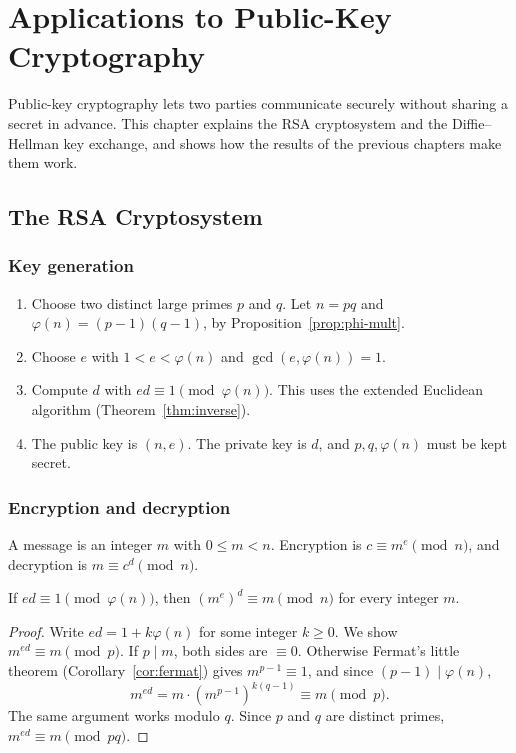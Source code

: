 \chapter{Applications to Public-Key Cryptography}\label{ch:crypto}

Public-key cryptography lets two parties communicate securely without sharing a secret in advance. This chapter explains the RSA cryptosystem and the Diffie--Hellman key exchange, and shows how the results of the previous chapters make them work.

\section{The RSA Cryptosystem}

\subsection{Key generation}

\begin{enumerate}
  \item Choose two distinct large primes $p$ and $q$. Let $n=pq$ and $\varphi(n)=(p-1)(q-1)$, by Proposition~\ref{prop:phi-mult}.
  \item Choose $e$ with $1<e<\varphi(n)$ and $\gcd(e,\varphi(n))=1$.
  \item Compute $d$ with $ed\equiv 1\pmod{\varphi(n)}$. This uses the extended Euclidean algorithm (Theorem~\ref{thm:inverse}).
  \item The public key is $(n,e)$. The private key is $d$, and $p,q,\varphi(n)$ must be kept secret.
\end{enumerate}

\subsection{Encryption and decryption}

A message is an integer $m$ with $0\le m<n$. Encryption is $c\equiv m^e\pmod n$, and decryption is $m\equiv c^d\pmod n$.

\begin{theorem}\label{thm:rsa}
If $ed\equiv 1\pmod{\varphi(n)}$, then $(m^e)^d\equiv m\pmod n$ for every integer $m$.
\end{theorem}

\begin{proof}
Write $ed=1+k\varphi(n)$ for some integer $k\ge 0$. We show $m^{ed}\equiv m\pmod p$. If $p\mid m$, both sides are $\equiv 0$. Otherwise Fermat's little theorem (Corollary~\ref{cor:fermat}) gives $m^{p-1}\equiv 1$, and since $(p-1)\mid\varphi(n)$,
\[
  m^{ed}=m\cdot (m^{p-1})^{k(q-1)}\equiv m\pmod p.
\]
The same argument works modulo $q$. Since $p$ and $q$ are distinct primes, $m^{ed}\equiv m\pmod{pq}$.
\end{proof}

